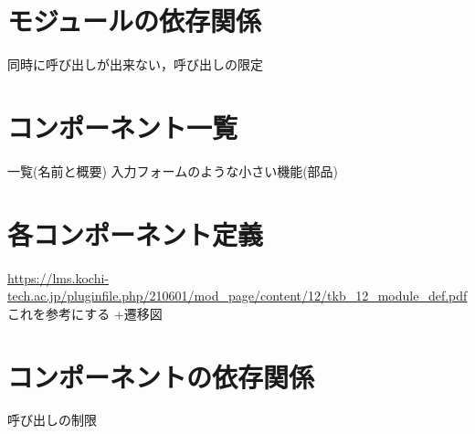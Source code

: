 \documentclass[a4paper, titlepage]{jsarticle}
\begin{document}
\section{モジュールの依存関係}
同時に呼び出しが出来ない，呼び出しの限定


\section{コンポーネント一覧}
一覧(名前と概要)
入力フォームのような小さい機能(部品)
\section{各コンポーネント定義}
\url{https://lms.kochi-tech.ac.jp/pluginfile.php/210601/mod_page/content/12/tkb_12_module_def.pdf}これを参考にする
+遷移図
\section{コンポーネントの依存関係}
呼び出しの制限


\end{document}
